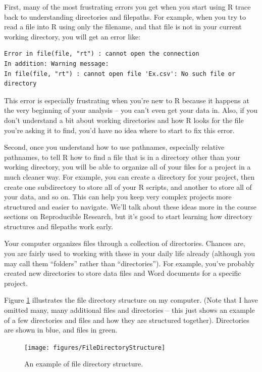 \documentclass[]{book}
\begin{document}
First, many of the most frustrating errors you get when you start using
R trace back to understanding directories and filepaths. For example,
when you try to read a file into R using only the filename, and that
file is not in your current working directory, you will get an error
like:

\begin{verbatim}
Error in file(file, "rt") : cannot open the connection
In addition: Warning message:
In file(file, "rt") : cannot open file 'Ex.csv': No such file or directory
\end{verbatim}

This error is especially frustrating when you're new to R because it
happens at the very beginning of your analysis -- you can't even get
your data in. Also, if you don't understand a bit about working
directories and how R looks for the file you're asking it to find, you'd
have no idea where to start to fix this error.

Second, once you understand how to use pathnames, especially relative
pathnames, to tell R how to find a file that is in a directory other
than your working directory, you will be able to organize all of your
files for a project in a much cleaner way. For example, you can create a
directory for your project, then create one subdirectory to store all of
your R scripts, and another to store all of your data, and so on. This
can help you keep very complex projects more structured and easier to
navigate. We'll talk about these ideas more in the course sections on
Reproducible Research, but it's good to start learning how directory
structures and filepaths work early.

Your computer organizes files through a collection of directories.
Chances are, you are fairly used to working with these in your daily
life already (although you may call them ``folders'' rather than
``directories''). For example, you've probably created new directories
to store data files and Word documents for a specific project.

Figure \ref{fig:filedirstructure} illustrates the file directory
structure on my computer. (Note that I have omitted many, many
additional files and directories -- this just shows an example of a few
directories and files and how they are structured together). Directories
are shown in blue, and files in green.

\begin{figure}

{\centering \texttt{[image: figures/FileDirectoryStructure]} 

}

\caption{An example of file directory structure.}\label{fig:filedirstructure}
\end{figure}
\end{document}
